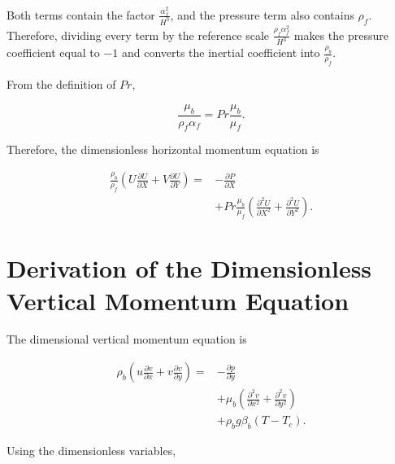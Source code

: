 \documentclass[preprint,3p,number]{elsarticle}
\begin{document}
Both terms contain the factor
\(\displaystyle \frac{\alpha_f^2}{H^3}\),
and the pressure term also contains \(\rho_f\).
Therefore, dividing every term by the reference scale
\(\displaystyle \frac{\rho_f\alpha_f^2}{H^3}\)
makes the pressure coefficient equal to \(-1\) and converts
the inertial coefficient into \(\displaystyle \frac{\rho_b}{\rho_f}\).

\par\vspace{\baselineskip}
From the definition of \(Pr\),

\begin{equation}
\frac{\mu_b}{\rho_f\alpha_f}
=
Pr\frac{\mu_b}{\mu_f}.
\label{eq:horizontal_viscosity}
\end{equation}

Therefore, the dimensionless horizontal momentum equation is

\begin{equation}
\boxed{
\begin{aligned}
\frac{\rho_b}{\rho_f}
\left(
U\frac{\partial U}{\partial X}
+
V\frac{\partial U}{\partial Y}
\right)
={}&-\frac{\partial P}{\partial X}\\
&+Pr\frac{\mu_b}{\mu_f}
\left(
\frac{\partial^2U}{\partial X^2}
+
\frac{\partial^2U}{\partial Y^2}
\right).
\end{aligned}
}
\label{eq:horizontal_dimensionless}
\end{equation}

\section{Derivation of the Dimensionless Vertical Momentum Equation}

The dimensional vertical momentum equation is

\begin{equation}
\begin{aligned}
\rho_b
\left(
u\frac{\partial v}{\partial x}
+
v\frac{\partial v}{\partial y}
\right)
={}&-\frac{\partial p}{\partial y}\\
&+\mu_b
\left(
\frac{\partial^2v}{\partial x^2}
+
\frac{\partial^2v}{\partial y^2}
\right)\\
&+\rho_b g\beta_b(T-T_c).
\end{aligned}
\label{eq:vertical_start}
\end{equation}

Using the dimensionless variables,
\end{document}

